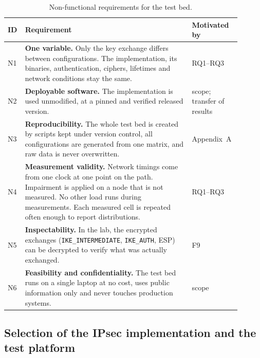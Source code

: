 \begin{table}[!h] \centering
    \footnotesize
    \caption{Non-functional requirements for the test bed.}
    \label{tab:req-nonfunctional}
    \begin{tabular}{| p{0.05\linewidth} | p{0.68\linewidth} | p{0.17\linewidth} |} \hline
        ID & Requirement & Motivated by \\ \hline\hline
        N1 & \textbf{One variable.} Only the key exchange differs between
             configurations. The implementation, its binaries,
             authentication, ciphers, lifetimes and network conditions stay
             the same.
           & RQ1--RQ3 \\ \hline
        N2 & \textbf{Deployable software.} The implementation is used
             unmodified, at a pinned and verified released version.
           & scope; transfer of results \\ \hline
        N3 & \textbf{Reproducibility.} The whole test bed is created by
             scripts kept under version control, all configurations are
             generated from one matrix, and raw data is never overwritten.
           & Appendix~A \\ \hline
        N4 & \textbf{Measurement validity.} Network timings come from one
             clock at one point on the path. Impairment is applied on a node
             that is not measured. No other load runs during measurements.
             Each measured cell is repeated often enough to report
             distributions.
           & RQ1--RQ3 \\ \hline
        N5 & \textbf{Inspectability.} In the lab, the encrypted exchanges
             (\texttt{IKE\_INTERMEDIATE}, \texttt{IKE\_AUTH}, ESP) can be
             decrypted to verify what was actually exchanged.
           & F9 \\ \hline
        N6 & \textbf{Feasibility and confidentiality.} The test bed runs on
             a single laptop at no cost, uses public information only and
             never touches production systems.
           & scope \\ \hline
    \end{tabular}
\end{table}

\subsection{Selection of the IPsec implementation and the test platform}
\label{sec:analysis-vpn}

